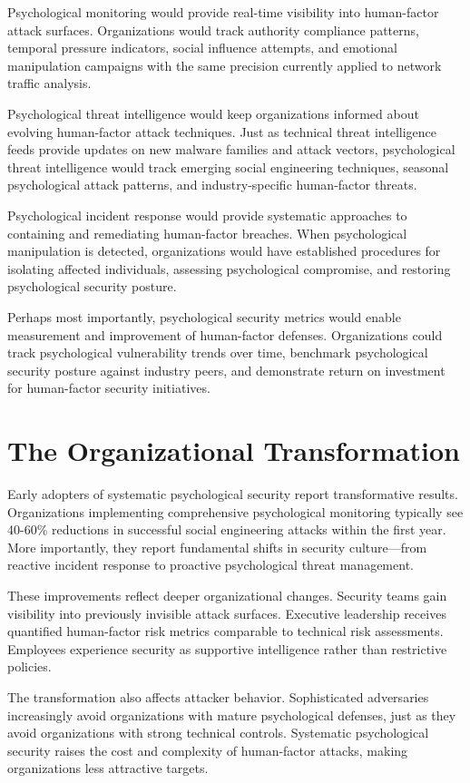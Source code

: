 \documentclass[10pt, twocolumn]{article}
\begin{document}
Psychological monitoring would provide real-time visibility into human-factor attack surfaces. Organizations would track authority compliance patterns, temporal pressure indicators, social influence attempts, and emotional manipulation campaigns with the same precision currently applied to network traffic analysis.

Psychological threat intelligence would keep organizations informed about evolving human-factor attack techniques. Just as technical threat intelligence feeds provide updates on new malware families and attack vectors, psychological threat intelligence would track emerging social engineering techniques, seasonal psychological attack patterns, and industry-specific human-factor threats.

Psychological incident response would provide systematic approaches to containing and remediating human-factor breaches. When psychological manipulation is detected, organizations would have established procedures for isolating affected individuals, assessing psychological compromise, and restoring psychological security posture.

Perhaps most importantly, psychological security metrics would enable measurement and improvement of human-factor defenses. Organizations could track psychological vulnerability trends over time, benchmark psychological security posture against industry peers, and demonstrate return on investment for human-factor security initiatives.

\section{The Organizational Transformation}

Early adopters of systematic psychological security report transformative results. Organizations implementing comprehensive psychological monitoring typically see 40-60\% reductions in successful social engineering attacks within the first year. More importantly, they report fundamental shifts in security culture—from reactive incident response to proactive psychological threat management.

These improvements reflect deeper organizational changes. Security teams gain visibility into previously invisible attack surfaces. Executive leadership receives quantified human-factor risk metrics comparable to technical risk assessments. Employees experience security as supportive intelligence rather than restrictive policies.

The transformation also affects attacker behavior. Sophisticated adversaries increasingly avoid organizations with mature psychological defenses, just as they avoid organizations with strong technical controls. Systematic psychological security raises the cost and complexity of human-factor attacks, making organizations less attractive targets.
\end{document}
